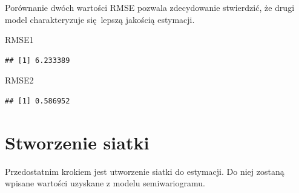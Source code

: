 \documentclass[
  paper=6in:9in,pagesize=pdftex,headinclude=on,footinclude=on,10pt]{scrbook}
\newenvironment{Shaded}{\begin{snugshade}}{\end{snugshade}}
\newcommand{\AttributeTok}[1]{\textcolor[rgb]{0.13,0.29,0.53}{#1}}
\newcommand{\DecValTok}[1]{\textcolor[rgb]{0.00,0.00,0.81}{#1}}
\newcommand{\FunctionTok}[1]{\textcolor[rgb]{0.13,0.29,0.53}{\textbf{#1}}}
\newcommand{\NormalTok}[1]{#1}
\newcommand{\OtherTok}[1]{\textcolor[rgb]{0.56,0.35,0.01}{#1}}
\newcommand{\SpecialCharTok}[1]{\textcolor[rgb]{0.81,0.36,0.00}{\textbf{#1}}}
\begin{document}
\begin{Shaded}
\end{Shaded}

Porównanie dwóch wartości RMSE pozwala zdecydowanie stwierdzić, że drugi model charakteryzuje się~lepszą jakością estymacji.

\begin{Shaded}
\begin{Highlighting}[]
\NormalTok{RMSE1}
\end{Highlighting}
\end{Shaded}

\begin{verbatim}
## [1] 6.233389
\end{verbatim}

\begin{Shaded}
\begin{Highlighting}[]
\NormalTok{RMSE2}
\end{Highlighting}
\end{Shaded}

\begin{verbatim}
## [1] 0.586952
\end{verbatim}

\section{Stworzenie siatki}\label{stworzenie-siatki}

Przedostatnim krokiem jest utworzenie siatki do estymacji.
Do niej zostaną wpisane wartości uzyskane z modelu semiwariogramu.

\begin{Shaded}
\end{Shaded}
\end{document}
